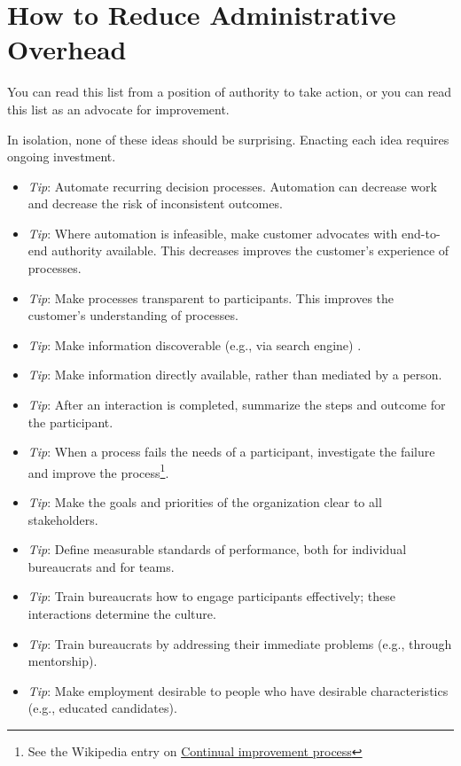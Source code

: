 \section{How to Reduce Administrative Overhead\label{sec:reducing-overhead}}

You can read this list from a position of authority to take action, or you can read this list as an advocate for improvement. 

In isolation, none of these ideas should be surprising. Enacting each idea requires ongoing investment. 
\begin{itemize}
    \item \textit{Tip}: Automate recurring decision processes. Automation can decrease work and decrease the risk of inconsistent outcomes.
\item \textit{Tip}: Where automation is infeasible, make customer advocates with end-to-end authority available. 
This decreases improves the customer's experience of processes.
\item \textit{Tip}: Make processes transparent to participants. 
This improves the customer's understanding of processes.
\item \textit{Tip}: Make information discoverable (e.g., via search engine) .
\item \textit{Tip}: Make information directly available, rather than mediated by a person.
\item \textit{Tip}: After an interaction is completed, summarize the steps and outcome for the participant. 
\item \textit{Tip}: When a process fails the needs of a participant, investigate the failure and improve the process\footnote{See the Wikipedia entry on \href{https://en.wikipedia.org/wiki/Continual_improvement_process}{Continual improvement process}}. 
\item \textit{Tip}: Make the goals and priorities of the organization clear to all stakeholders.
\item \textit{Tip}: Define measurable standards of performance, both for individual bureaucrats and for teams.
\item \textit{Tip}: Train bureaucrats how to engage participants effectively; these interactions determine the culture.
\item \textit{Tip}: Train bureaucrats by addressing their immediate problems (e.g., through mentorship).
\item \textit{Tip}: Make employment desirable to people who have desirable characteristics (e.g., educated candidates).

\end{itemize}

